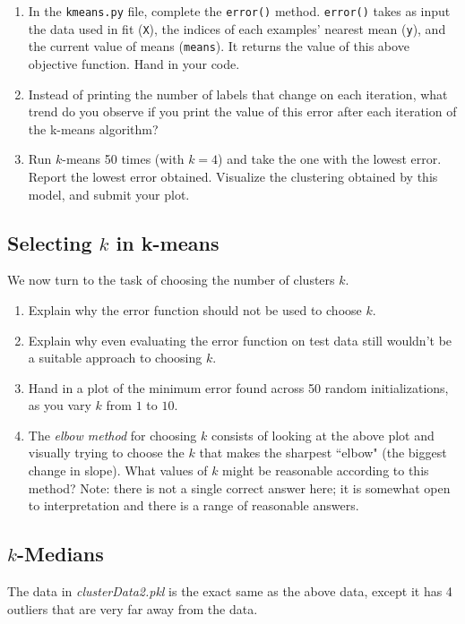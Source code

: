 \documentclass{article}
\def\blu#1{{\color{blu}#1}}
\let\ask\blu
\def\enum#1{\begin{enumerate}#1\end{enumerate}}
\begin{document}
 \blu{\enum{
 \item In the \texttt{kmeans.py} file, complete the \texttt{error()} method. \texttt{error()} takes as input the data used in fit (\texttt{X}), the indices of each examples' nearest mean (\texttt{y}), and the current value of means (\texttt{means}). It returns the value of this above objective function. Hand in your code.
 \item Instead of printing the number of labels that change on each iteration, what trend do you observe if you print the value of this error after each iteration of the k-means algorithm?
 \item Run $k$-means 50 times (with $k=4$) and take the one with the lowest error. \ask{Report the lowest error obtained.} Visualize the clustering obtained by this model, and \ask{submit your plot}.
 }}


 \pagebreak

 \subsection{Selecting $k$ in k-means}

 We now turn to the task of choosing the number of clusters $k$.

 \blu{\enum{
 \item Explain why the error function should not be used to choose $k$.
 \item Explain why even evaluating the error function on test data still wouldn't be a suitable approach to choosing $k$.
 \item Hand in a plot of the minimum error found across 50 random initializations, as you vary $k$ from $1$ to $10$.
 \item The \emph{elbow method} for choosing $k$ consists of looking at the above plot and visually trying to choose the $k$ that makes the sharpest ``elbow" (the biggest change in slope). What values of $k$ might be reasonable according to this method? Note: there is not a single correct answer here; it is somewhat open to interpretation and there is a range of reasonable answers.
 }}

 \pagebreak

 \subsection{$k$-Medians}

 The data in \emph{clusterData2.pkl} is the exact same as the above data, except it has 4 outliers that are very far away from the data.
\end{document}
